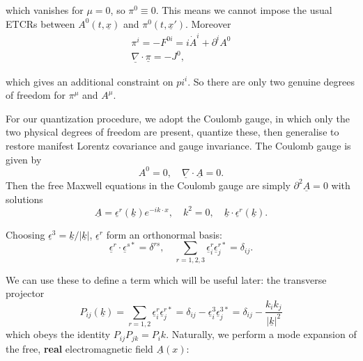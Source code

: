 \documentclass{article}
\numberwithin{equation}{section}
\begin{document}
which vanishes for $\mu = 0$, so $\pi^0 \equiv 0$. This means we cannot impose the usual ETCRs between $A^0(t, \underline{x})$ and $\pi^0(t, \underline{x}')$. Moreover
\begin{gather}
    \pi^i = -F^{0i} = i\dot{A}^i + \partial^i A^0 \\
    \underline{\nabla} \cdot \underline{\pi} = -J^0,
\end{gather}

which gives an additional constraint on $pi^i$. So there are only two genuine degrees of freedom for $\pi^\mu$ and $A^\mu$. 

For our quantization procedure, we adopt the Coulomb gauge, in which only the two physical degrees of freedom are present, quantize these, then generalise to restore manifest Lorentz covariance and gauge invariance. The Coulomb gauge is given by 
\begin{equation}
    A^0 = 0, \quad \underline{\nabla} \cdot \underline{A} = 0.
\end{equation}
Then the free Maxwell equations in the Coulomb gauge are simply $\partial^2 \underline{A} = 0$ with solutions
\begin{equation}
    \underline{A} = \underline{\epsilon}^r(\underline{k}) e^{-ik\cdot x}, \quad k^2 = 0, \quad \underline{k} \cdot \underline{\epsilon}^r(\underline{k}).
\end{equation}

Choosing $\underline{\epsilon}^3 = \underline{k}/|\underline{k}|$, $\underline{\epsilon}^r$ form an orthonormal basis:
\begin{equation}
    \underline{\epsilon}^r \cdot \underline{\epsilon}^{s*} = \delta^{rs}, \quad \sum_{r=1, 2, 3}\underline{\epsilon}_i^r \underline{\epsilon}_j^{r*} = \delta_{ij}.
\end{equation}

We can use these to define a term which will be useful later: the transverse projector
\begin{equation}
    P_{ij}(\underline{k}) = \sum_{r=1, 2} \underline{\epsilon}_i^r \underline{\epsilon}_j^{r*} = \delta_{ij} - \underline{\epsilon}_i^3 \underline{\epsilon}_j^{3*} = \delta_{ij} - \frac{k_i k_j}{|\underline{k}|^2}
\end{equation}
which obeys the identity $P_{ij}P_{jk} = P_ik$.
Naturally, we perform a mode expansion of the free, \textbf{real} electromagnetic field $\underline{A}(x)$:
\end{document}

